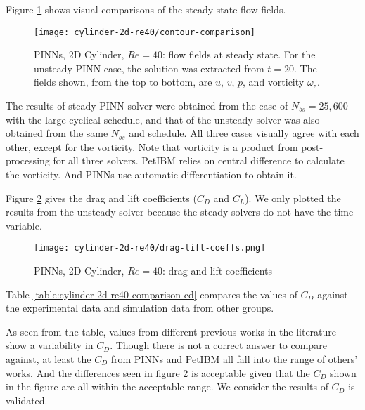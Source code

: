 Figure \ref{fig:cylinder-2d-re40-contours} shows visual comparisons of the steady-state flow fields.
\begin{figure}[hbt!]
    \texttt{[image: cylinder-2d-re40/contour-comparison]}
    \caption[%
        PINNs, 2D Cylinder, $Re=40$: flow fields at steady state%
    ]{%
        PINNs, 2D Cylinder, $Re=40$: flow fields at steady state. %
        For the unsteady PINN case, the solution was extracted from $t=20$. %
        The fields shown, from the top to bottom, are $u$, $v$, $p$, and vorticity $\omega_z$.%
    }%
    \label{fig:cylinder-2d-re40-contours}
\end{figure}
The results of steady PINN solver were obtained from the case of $N_{bs}=25,600$ with the large cyclical schedule, and that of the unsteady solver was also obtained from the same $N_{bs}$ and schedule.
All three cases visually agree with each other, except for the vorticity.
Note that vorticity is a product from post-processing for all three solvers.
PetIBM relies on central difference to calculate the vorticity.
And PINNs use automatic differentiation to obtain it.

Figure \ref{fig:cylinder-2d-re40-drag-lift-time} gives the drag and lift coefficients ($C_D$ and $C_L$).
We only plotted the results from the unsteady solver because the steady solvers do not have the time variable. 
\begin{figure}[hbt!]
    \texttt{[image: cylinder-2d-re40/drag-lift-coeffs.png]}
    \caption[%
        PINNs, 2D Cylinder, $Re=40$: drag and lift coefficients%
    ]{%
        PINNs, 2D Cylinder, $Re=40$: drag and lift coefficients%
    }%
    \label{fig:cylinder-2d-re40-drag-lift-time}
\end{figure}
Table \ref{table:cylinder-2d-re40-comparison-cd} compares the values of $C_D$ against the experimental data and simulation data from other groups.

As seen from the table, values from different previous works in the literature show a variability in $C_D$.
Though there is not a correct answer to compare against, at least the $C_D$ from PINNs and PetIBM all fall into the range of others' works.
And the differences seen in figure \ref{fig:cylinder-2d-re40-drag-lift-time} is acceptable given that the $C_D$ shown in the figure are all within the acceptable range.
We consider the results of $C_D$ is validated.

